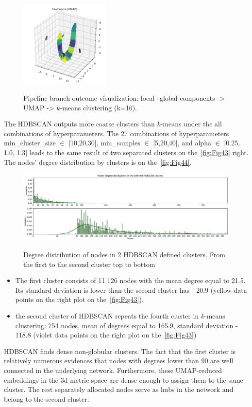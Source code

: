 \begin{figure}[!ht]
	\centering
	\includegraphics[width=0.4\textwidth]{images/evaluations/Fig46.pdf}\\
	\caption{Pipeline branch outcome visualization: local+global components -> UMAP -> $k$-means clustering (k=16).}
	\label{fig:Fig46}
\end{figure}

The HDBSCAN outputs more coarse clusters than $k$-means under the all combinations of hyperparameters. The 27 combinations of hyperparameters min\_cluster\_size $\in$ [10,20,30], min\_samples $\in$ [5,20,40], and alpha $\in$ [0.25, 1.0, 1.3] leads to the same result of two separated clusters on the~\autoref{fig:Fig43} right. The nodes' degree distribution by clusters is on the~\autoref{fig:Fig44}. 
\begin{figure}[H]
	\centering
	\includegraphics[width=1.0\textwidth]{images/evaluations/Fig45.pdf}\\
	\caption{Degree distribution of nodes in 2 HDBSCAN defined clusters. From the first to the second cluster top to bottom}
	\label{fig:Fig45}
\end{figure}
    \begin{itemize}
        \item The first cluster consists of 11 126 nodes with the mean degree equal to 21.5. Its standard deviation is lower than the second cluster has - 20.9 (yellow data points on the right plot on the~\autoref{fig:Fig43}).
        \item the second cluster of HDBSCAN repeats the fourth cluster in $k$-means clustering: 754 nodes, mean of degrees equal to 165.9, standard deviation - 118.8 (violet data points on the right plot on the~\autoref{fig:Fig43})
    \end{itemize}
HDBSCAN finds dense non-globular clusters. The fact that the first cluster is relatively numerous evidences that nodes with degrees lower than 90 are well connected in the underlying network. Furthermore, these UMAP-reduced embeddings in the 3d metric space are dense enough to assign them to the same cluster. The rest separately allocated nodes serve as hubs in the network and belong to the second cluster.

